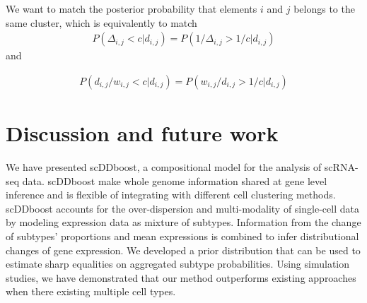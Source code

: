 \documentclass[11pt]{amsart}
\begin{document}
We want to match the posterior probability that elements $i$ and $j$ belongs to the same cluster, which is equivalently to match 
\begin{eqnarray*}
P(\Delta_{i,j} < c | d_{i,j}) = P( 1 /  \Delta_{i,j} > 1 / c | d_{i,j})
\end{eqnarray*}
and 

\begin{eqnarray*}
P(d_{i,j} / w_{i,j} < c | d_{i,j}) = P(w_{i,j} / d_{i,j} > 1 / c | d_{i,j})
\end{eqnarray*}



\section{Discussion and future work}
We have presented scDDboost, a compositional model for the analysis of scRNA-seq data. scDDboost make whole genome information shared at gene level inference and is flexible of integrating with different cell clustering methods. scDDboost accounts for the over-dispersion and multi-modality of single-cell data by modeling expression data as mixture of subtypes. Information from the change of subtypes' proportions and mean expressions is combined to infer distributional changes of gene expression. We developed a prior distribution that can be used to estimate sharp equalities on aggregated subtype probabilities. Using simulation studies, we have demonstrated that our method outperforms existing approaches when there existing multiple cell types. 
\end{document}

